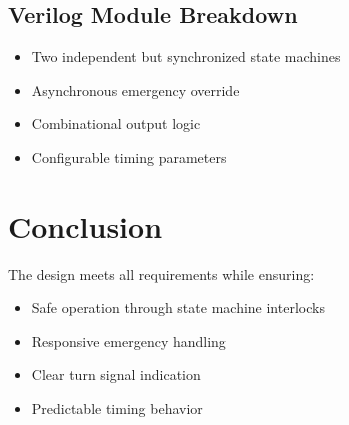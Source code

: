 \documentclass{article}
\begin{document}
\subsection{Verilog Module Breakdown}
\begin{itemize}
    \item Two independent but synchronized state machines
    \item Asynchronous emergency override
    \item Combinational output logic
    \item Configurable timing parameters
\end{itemize}

\section{Conclusion}
The design meets all requirements while ensuring:
\begin{itemize}
    \item Safe operation through state machine interlocks
    \item Responsive emergency handling
    \item Clear turn signal indication
    \item Predictable timing behavior
\end{itemize}
\end{document}
